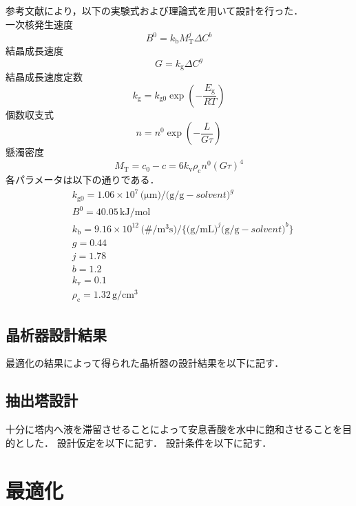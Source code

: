 \documentclass[a4j]{jsreport}
\begin{document}
参考文献\cite{晶析}により，以下の実験式および理論式を用いて設計を行った．\\
一次核発生速度
\begin{equation}
    B^0 = k_\mathrm{b} M_\mathrm{T}^j \Delta C^b
\end{equation}
結晶成長速度
\begin{equation}
    G = k_\mathrm{g}\Delta C^g
\end{equation}
結晶成長速度定数
\begin{equation}
    k_\mathrm{g} = k_\mathrm{g0} \exp \left( -\frac{E_\mathrm{g}}{RT} \right)
\end{equation}
個数収支式
\begin{equation}
    n=n^0 \exp \left( -\frac{L}{G\tau} \right)
\end{equation}
懸濁密度
\begin{equation}
    M_\mathrm{T} = c_0-c = 6k_\mathrm{v} \rho_\mathrm{c} n^0 (G\tau)^4
\end{equation}
各パラメータは以下の通りである．
\begin{align*}
    &k_\mathrm{g0} = 1.06\times10^7 \, \si{(\micro \meter)/(\gram / \gram-solvent)^{\textit{g}}} \\
    &B^{\mathrm{0}} = 40.05 \, \si{\kilo \joule / \mole} \\
    &k_\mathrm{b} = 9.16 \times 10^{12} \, \si{(\# / \cubic \meter \second) / \{ (\gram / \milli \liter)^{\textit{j}} (\gram / \gram-solvent)^{\textit{b}} \} } \\
    &g = 0.44 \\
    &j = 1.78 \\
    &b = 1.2 \\
    &k_\mathrm{v} = 0.1 \\
    &\rho_\mathrm{c} = 1.32 \, \si{\gram / \centi \metre \cubed}
\end{align*}


\section{晶析器設計結果}
最適化の結果によって得られた晶析器の設計結果を以下に記す．

\section{抽出塔設計}
十分に塔内へ液を滞留させることによって安息香酸を水中に飽和させることを目的とした．
設計仮定を以下に記す．
設計条件を以下に記す．


\newpage
\chapter{最適化}
\end{document}
